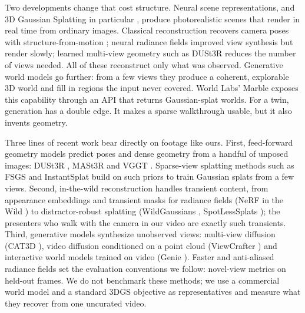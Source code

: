 \documentclass{article}
\begin{document}
Two developments change that cost structure. Neural scene representations,
and 3D Gaussian Splatting in particular \cite{kerbl20233d}, produce
photorealistic scenes that render in real time from ordinary images. Classical
reconstruction recovers camera poses with structure-from-motion
\cite{schoenberger2016sfm}; neural radiance fields \cite{mildenhall2020nerf}
improved view synthesis but render slowly; learned multi-view geometry such as
DUSt3R \cite{wang2024dust3r} reduces the number of views needed. All of these
reconstruct only what was observed. Generative world models
\cite{ha2018world,brooks2024video} go further: from a few views they produce a
coherent, explorable 3D world and fill in regions the input never covered.
World Labs' Marble \cite{worldlabs_marble} exposes this capability through an
API that returns Gaussian-splat worlds. For a twin, generation has a double
edge. It makes a sparse walkthrough usable, but it also invents geometry.

Three lines of recent work bear directly on footage like ours. First,
feed-forward geometry models predict poses and dense geometry from a handful of
unposed images: DUSt3R \cite{wang2024dust3r}, MASt3R \cite{leroy2024mast3r} and
VGGT \cite{wang2025vggt}. Sparse-view splatting methods such as FSGS
\cite{zhu2023fsgs} and InstantSplat \cite{fan2024instantsplat} build on such
priors to train Gaussian splats from a few views. Second, in-the-wild
reconstruction handles transient content, from appearance embeddings and
transient masks for radiance fields (NeRF in the Wild \cite{martinbrualla2020nerfw})
to distractor-robust splatting (WildGaussians \cite{kulhanek2024wildgaussians},
SpotLessSplats \cite{sabour2024spotless}); the presenters who walk with the
camera in our video are exactly such transients. Third, generative models
synthesize unobserved views: multi-view diffusion (CAT3D \cite{gao2024cat3d}),
video diffusion conditioned on a point cloud (ViewCrafter \cite{yu2024viewcrafter})
and interactive world models trained on video (Genie \cite{bruce2024genie}).
Faster and anti-aliased radiance fields \cite{muller2022instantngp,barron2022mipnerf360}
set the evaluation conventions we follow: novel-view metrics on held-out frames.
We do not benchmark these methods; we use a commercial world model and a
standard 3DGS objective as representatives and measure what they recover from
one uncurated video.
\end{document}
